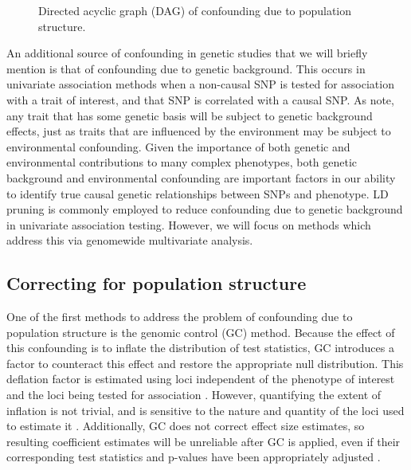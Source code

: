 \begin{figure}[H]
\centering
{}
\caption{Directed acyclic graph (DAG) of confounding due to population structure.}
\label{fig:ps_env}
\end{figure}

An additional source of confounding in genetic studies that we will briefly mention is that of confounding due to genetic background. This occurs in univariate association methods when a non-causal SNP is tested for association with a trait of interest, and that SNP is correlated with a causal SNP. As \citet{vilhjalmsson2012nature} note, any trait that has some genetic basis will be subject to genetic background effects, just as traits that are influenced by the environment may be subject to environmental confounding. Given the importance of both genetic and environmental contributions to many complex phenotypes, both genetic background and environmental confounding are important factors in our ability to identify true causal genetic relationships between SNPs and phenotype. LD pruning is commonly employed to reduce confounding due to genetic background in univariate association testing. However, we will focus on methods which address this via genomewide multivariate analysis.

\subsection{Correcting for population structure}

One of the first methods to address the problem of confounding due to population structure is the genomic control (GC) method. Because the effect of this confounding is to inflate the distribution of test statistics, GC introduces a factor to counteract this effect and restore the appropriate null distribution. This deflation factor is estimated using loci independent of the phenotype of interest and the loci being tested for association \citep{devlin1999genomic, bacanu2000power, wang2009testing}. However, quantifying the extent of inflation is not trivial, and is sensitive to the nature and quantity of the loci used to estimate it \citep{hellwege2017population, marchini2004effects}. Additionally, GC does not correct effect size estimates, so resulting coefficient estimates will be unreliable after GC is applied, even if their corresponding test statistics and p-values have been appropriately adjusted \citep{hellwege2017population}.

